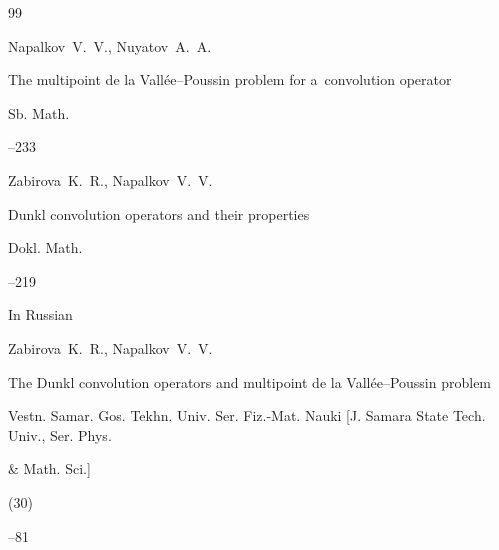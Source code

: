 \begin{thebibliography}{99}

\by Napalkov~V.~V., Nuyatov~A.~A.

\paper The multipoint de la Vall\'ee--Poussin problem for a~convolution operator

\jour Sb. Math.




--233







\by Zabirova~K.~R., Napalkov~V.~V.

\paper Dunkl convolution operators and their properties



\jour Dokl. Math.



--219 












\lang In Russian

\by Zabirova~K.~R., Napalkov~V.~V.

\paper The Dunkl convolution operators and multipoint de la Vall\'ee--Poussin problem

\jour Vestn. Samar. Gos. Tekhn. Univ. Ser. Fiz.-Mat. Nauki \rm [J. Samara State Tech. Univ., Ser. Phys.

\& Math. Sci.]


(30)

--81






\end{thebibliography}
